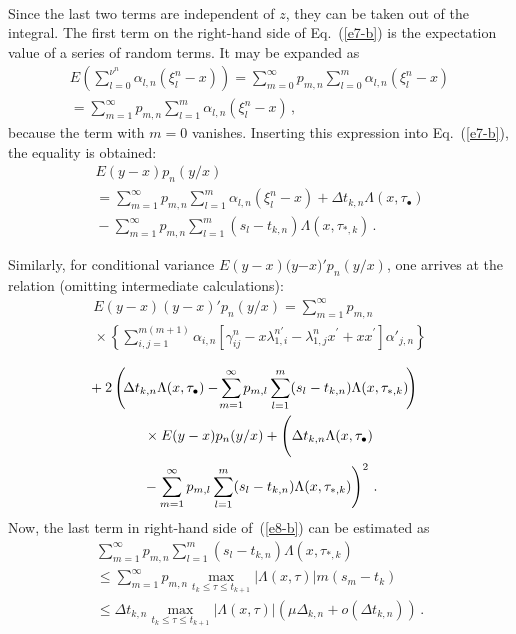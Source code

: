 \begin{multicols}{2}
\begin{multline}
\label{e7-b}
\end{multline}
Since the last two terms are independent of $z$, they can be taken out of the integral. 
The first term on the right-hand side of Eq.~(\ref{e7-b}) is the expectation value of a series of 
random terms. It may be expanded as
\begin{multline*}
E\left(\sum\limits_{l=0}^{\nu ^{n} }\alpha_{l,n}  (\xi_{l}^{n} -x)\right)=
\sum\limits_{m=0}^{\infty }p_{m,n}  \sum\limits_{l=0}^{m}\alpha_{l,n} (\xi_{l}^{n} -x) \\
{}=\sum\limits_{m=1}^{\infty }p_{m,n}  \sum\limits_{l=1}^{m}\alpha_{l,n} (\xi_{l}^{n} -x)\,,
\end{multline*}
because the term with $m=0$ vanishes. Inserting this expression into Eq.~(\ref{e7-b}), the equality 
is obtained:
\begin{multline}
E(y-x)p_{n} (y/x) \\
{}=\sum\limits_{m=1}^{\infty }p_{m,n}  \sum\limits_{l=1}^{m}\alpha_{l,n} (\xi_{l}^{n} -x) +
\Delta t_{k,n} \Lambda (x,\tau_{\bullet } )\\
{}-\sum\limits_{m=1}^{\infty }p_{m,n}  
\sum\limits_{l=1}^{m}(s_{l} -t_{k,n}  )\Lambda (x,\tau_{*,k} )\,.
\label{e8-b}
\end{multline}

Similarly, for conditional variance $E(y-x)(y$\linebreak $-x)'p_{n} (y/x)$, one arrives 
at the relation (omitting intermediate calculations):
\begin{multline*}
E(y-x)(y-x)'p_{n} (y/x) =\sum\limits_{m=1}^{\infty }p_{m,n} \\
{}\times
\left\{ 
\sum\limits_{i,j=1}^{m(m+1)}\alpha_{i,n}  
\left[\gamma_{ij}^{n} -x \lambda_{1,i}^{n'} -\lambda_{1,j}^{n} x^\prime+xx^\prime\right]
\alpha '_{j,n} 
\right\}
\end{multline*}

\noindent
\begin{multline}
\hspace*{-9.51pt}{} + 2\left(\!\Delta t_{k,n} \Lambda (x,\tau_{\bullet } ) 
-\!
\sum\limits_{m=1}^{\infty }\!p_{m,l}  
\sum\limits_{l=1}^{m}(s_{l} -t_{k,n}  )\Lambda (x,\tau_{*,k} )\!\right)\\
{}\times E(y-x)p_{n} (y/x)+ 
\left(\vphantom{\sum\limits_{l=1}^m}
\Delta t_{k,n} \Lambda (x,\tau_{\bullet } )\right. \\
\left.{}-
\sum\limits_{m=1}^{\infty } p_{m,l} \sum\limits_{l=1}^{m}(s_{l} -t_{k,n}  )
\Lambda (x,\tau_{*,k} )\right)^{2} \,.
\label{e9-b}
\end{multline}
Now, the last term in right-hand side of~(\ref{e8-b}) can be estimated as
\begin{multline*}
\sum\limits_{m=1}^{\infty }p_{m,n}  \sum\limits_{l=1}^{m}(s_{l} -t_{k,n}  )
\Lambda (x,\tau_{*,k} ) \\
{}\leq \sum\limits_{m=1}^{\infty }p_{m,n}  {\max }_{t_{k} \le \tau \le t_{k+1} } 
|\Lambda (x,\tau )|m(s_{m} -t_{k} ) \\
{}\leq \Delta t_{k,n} {\max }_{t_{k} \le \tau \le t_{k+1} } |\Lambda (x,\tau )|
(\mu \Delta_{k,n} +o(\Delta t_{k,n} ))\,.
\end{multline*}


\end{multicols}
